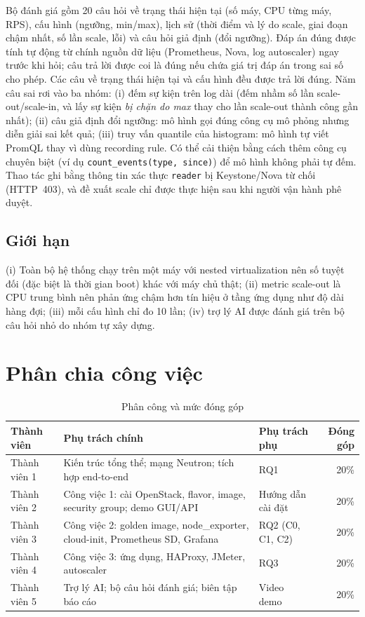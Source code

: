 \documentclass[runningheads]{llncs}
\newcommand{\code}[1]{\texttt{#1}}
\begin{document}
Bộ đánh giá gồm 20 câu hỏi về trạng thái hiện tại (số máy, CPU từng máy, RPS), cấu hình (ngưỡng, min/max), lịch sử (thời điểm và lý do scale, giai đoạn chậm nhất, số lần scale, lỗi) và câu hỏi giả định (đổi ngưỡng). Đáp án đúng được tính tự động từ chính nguồn dữ liệu (Prometheus, Nova, log autoscaler) ngay trước khi hỏi; câu trả lời được coi là đúng nếu chứa giá trị đáp án trong sai số cho phép.  Các câu về trạng thái hiện tại và cấu hình đều được trả lời đúng. Năm câu sai rơi vào ba nhóm: (i) đếm sự kiện trên log dài (đếm nhầm số lần scale-out/scale-in, và lấy sự kiện \emph{bị chặn do max} thay cho lần scale-out thành công gần nhất); (ii) câu giả định đổi ngưỡng: mô hình gọi đúng công cụ mô phỏng nhưng diễn giải sai kết quả; (iii) truy vấn quantile của histogram: mô hình tự viết PromQL thay vì dùng recording rule. Có thể cải thiện bằng cách thêm công cụ chuyên biệt (ví dụ \code{count\_events(type, since)}) để mô hình không phải tự đếm. Thao tác ghi bằng thông tin xác thực \code{reader} bị Keystone/Nova từ chối (HTTP~403), và đề xuất scale chỉ được thực hiện sau khi người vận hành phê duyệt.

\subsection{Giới hạn}

(i) Toàn bộ hệ thống chạy trên một máy với nested virtualization nên số tuyệt đối (đặc biệt là thời gian boot) khác với máy chủ thật; (ii) metric scale-out là CPU trung bình nên phản ứng chậm hơn tín hiệu ở tầng ứng dụng như độ dài hàng đợi; (iii) mỗi cấu hình chỉ đo 10 lần; (iv) trợ lý AI được đánh giá trên bộ câu hỏi nhỏ do nhóm tự xây dựng.

\section{Phân chia công việc}

\begin{table}[h]
\caption{Phân công và mức đóng góp}\label{tab:team}
\centering\small
\begin{tabularx}{\textwidth}{@{}lLLr@{}}
\toprule
Thành viên & Phụ trách chính & Phụ trách phụ & Đóng góp \\
\midrule
Thành viên 1 & Kiến trúc tổng thể; mạng Neutron; tích hợp end-to-end & RQ1 & 20\% \\
Thành viên 2 & Công việc 1: cài OpenStack, flavor, image, security group; demo GUI/API & Hướng dẫn cài đặt & 20\% \\
Thành viên 3 & Công việc 2: golden image, node\_exporter, cloud-init, Prometheus SD, Grafana & RQ2 (C0, C1, C2) & 20\% \\
Thành viên 4 & Công việc 3: ứng dụng, HAProxy, JMeter, autoscaler & RQ3 & 20\% \\
Thành viên 5 & Trợ lý AI; bộ câu hỏi đánh giá; biên tập báo cáo & Video demo & 20\% \\
\bottomrule
\end{tabularx}
\end{table}
\end{document}
